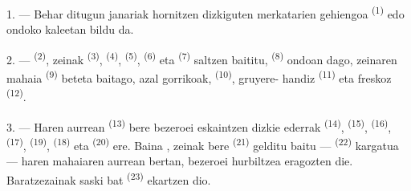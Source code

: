 %

\VUsaut{4.0mm}
\VUsaut{3.0mm}

\VUsaut{3.0mm}

1. --- Behar ditugun janariak hornitzen dizkiguten merkatarien gehiengoa
  \textsuperscript{(1)} edo
ondoko kaleetan bildu da.

2. ---  \textsuperscript{(2)}, zeinak
 \textsuperscript{(3)}, 
\textsuperscript{(4)},  \textsuperscript{(5)},
 \textsuperscript{(6)} eta 
\textsuperscript{(7)} saltzen baititu, 
\textsuperscript{(8)} ondoan dago, zeinaren mahaia 
\textsuperscript{(9)} beteta baitago, azal gorrikoak, 
\textsuperscript{(10)}, gruyere- handiz \textsuperscript{(11)} eta
 freskoz \textsuperscript{(12)}.

3. --- Haren aurrean  \textsuperscript{(13)} bere
bezeroei eskaintzen dizkie  ederrak \textsuperscript{(14)},
 \textsuperscript{(15)},  \textsuperscript{(16)},
 \textsuperscript{(17)}, 
\textsuperscript{(19)},  \textsuperscript{(18)} eta
 \textsuperscript{(20)} ere. Baina ,
zeinak bere  \textsuperscript{(21)} gelditu baitu ---
 \textsuperscript{(22)} kargatua --- haren mahaiaren
aurrean bertan, bezeroei hurbiltzea eragozten die. Baratzezainak
 saski bat \textsuperscript{(23)} ekartzen dio.

\VUsaut{4.0mm}
\VUsaut{3.0mm}

